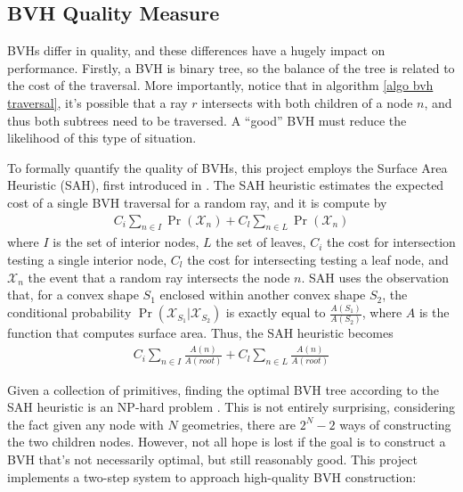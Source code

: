 \subsection{BVH Quality Measure}

BVHs differ in quality, and these differences have a hugely impact on performance. Firstly, a BVH is binary tree, so the balance of the tree is related to the cost of the traversal. More importantly, notice that in algorithm \ref{algo bvh traversal}, it's possible that a ray $r$ intersects with both children of a node $n$, and thus both subtrees need to be traversed. A ``good'' BVH must reduce the likelihood of this type of situation. 

To formally quantify the quality of BVHs, this project employs the Surface Area Heuristic (SAH), first introduced in \cite{goldsmith1987automatic}. The SAH heuristic estimates the expected cost of a single BVH traversal for a random ray, and it is compute by
\begin{align*}
    C_i \sum_{n\in I} \Pr(\mathcal{X}_n) + C_l \sum_{n\in L} \Pr(\mathcal{X}_n)
\end{align*}
where $I$ is the set of interior nodes, $L$ the set of leaves, $C_i$ the cost for intersection testing a single interior node, $C_l$ the cost for intersecting testing a leaf node, and $\mathcal{X}_n$ the event that a random ray intersects the node $n$. SAH uses the observation that, for a convex shape $S_1$ enclosed within another convex shape $S_2$, the conditional probability $\Pr(\mathcal{X}_{S_1} | \mathcal{X}_{S_2})$ is exactly equal to $\frac{A(S_1)}{A(S_2)}$, where $A$ is the function that computes surface area. Thus, the SAH heuristic becomes
\begin{align*}
    C_i \sum_{n\in I} \frac{A(n)}{A(root)} + C_l \sum_{n\in L} \frac{A(n)}{A(root)}
\end{align*}

Given a collection of primitives, finding the optimal BVH tree according to the SAH heuristic is an NP-hard problem \cite{bvh_optimize}. This is not entirely surprising, considering the fact given any node with $N$ geometries, there are $2^N-2$ ways of constructing the two children nodes. However, not all hope is lost if the goal is to construct a BVH that's not necessarily optimal, but still reasonably good. This project implements a two-step system to approach high-quality BVH construction:


